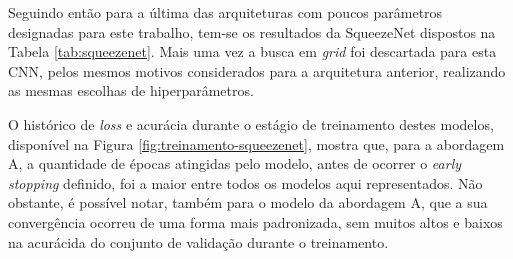 Seguindo então para a última das arquiteturas com poucos parâmetros designadas para este trabalho, tem-se os resultados da SqueezeNet dispostos na Tabela \ref{tab:squeezenet}. Mais uma vez a busca em \emph{grid} foi descartada para esta CNN, pelos mesmos motivos considerados para a arquitetura anterior, realizando as mesmas escolhas de hiperparâmetros.

\begin{table}[h!]
\centering
\caption{Detalhamento dos modelos obtidos com a arquitetura SqueezeNet para cada uma das abordagens consideradas neste trabalho.}
\label{tab:squeezenet}
\end{table}

O histórico de \emph{loss} e acurácia durante o estágio de treinamento destes modelos, disponível na Figura \ref{fig:treinamento-squeezenet}, mostra que, para a abordagem A, a quantidade de épocas atingidas pelo modelo, antes de ocorrer o \emph{early stopping} definido, foi a maior entre todos os modelos aqui representados. Não obstante, é possível notar, também para o modelo da abordagem A, que a sua convergência ocorreu de uma forma mais padronizada, sem muitos altos e baixos na acurácida do conjunto de validação durante o treinamento.
    
